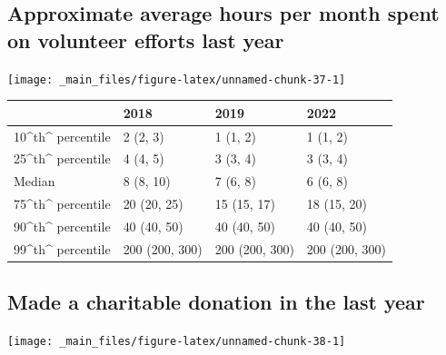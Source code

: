 \documentclass[
]{book}
\begin{document}
\hypertarget{approximate-average-hours-per-month-spent-on-volunteer-efforts-last-year}{%
\subsection{Approximate average hours per month spent on volunteer efforts last year}\label{approximate-average-hours-per-month-spent-on-volunteer-efforts-last-year}}

\texttt{[image: \_main\_files/figure-latex/unnamed-chunk-37-1]}

\begin{table}
\centering
\begin{tabular}[t]{>{}l|>{}l|>{}l|>{}l}
\hline
  & 2018 & 2019 & 2022\\
\hline
10\textasciicircum{}th\textasciicircum{} percentile & 2 (2, 3) & 1 (1, 2) & 1 (1, 2)\\
\hline
25\textasciicircum{}th\textasciicircum{} percentile & 4 (4, 5) & 3 (3, 4) & 3 (3, 4)\\
\hline
Median & 8 (8, 10) & 7 (6, 8) & 6 (6, 8)\\
\hline
75\textasciicircum{}th\textasciicircum{} percentile & 20 (20, 25) & 15 (15, 17) & 18 (15, 20)\\
\hline
90\textasciicircum{}th\textasciicircum{} percentile & 40 (40, 50) & 40 (40, 50) & 40 (40, 50)\\
\hline
99\textasciicircum{}th\textasciicircum{} percentile & 200 (200, 300) & 200 (200, 300) & 200 (200, 300)\\
\hline
\end{tabular}
\end{table}

\hypertarget{made-a-charitable-donation-in-the-last-year}{%
\subsection{Made a charitable donation in the last year}\label{made-a-charitable-donation-in-the-last-year}}

\texttt{[image: \_main\_files/figure-latex/unnamed-chunk-38-1]}
\end{document}
